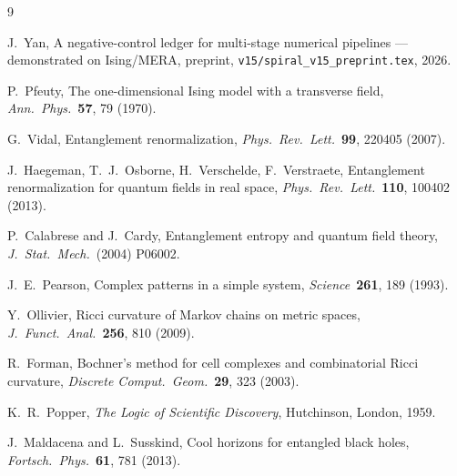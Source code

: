 \documentclass[11pt,a4paper]{article}
\newcommand{\code}[1]{\texttt{\small #1}}
\begin{document}
\begin{thebibliography}{9}

J.~Yan,
\newblock A negative-control ledger for multi-stage numerical pipelines
--- demonstrated on Ising/MERA,
\newblock preprint, \code{v15/spiral_v15_preprint.tex}, 2026.

P.~Pfeuty,
\newblock The one-dimensional Ising model with a transverse field,
\newblock \emph{Ann.\ Phys.}\ \textbf{57}, 79 (1970).

G.~Vidal,
\newblock Entanglement renormalization,
\newblock \emph{Phys.\ Rev.\ Lett.}\ \textbf{99}, 220405 (2007).

J.~Haegeman, T.~J.~Osborne, H.~Verschelde, F.~Verstraete,
\newblock Entanglement renormalization for quantum fields in real space,
\newblock \emph{Phys.\ Rev.\ Lett.}\ \textbf{110}, 100402 (2013).

P.~Calabrese and J.~Cardy,
\newblock Entanglement entropy and quantum field theory,
\newblock \emph{J.\ Stat.\ Mech.}\ (2004) P06002.

J.~E.~Pearson,
\newblock Complex patterns in a simple system,
\newblock \emph{Science}\ \textbf{261}, 189 (1993).

Y.~Ollivier,
\newblock Ricci curvature of Markov chains on metric spaces,
\newblock \emph{J.\ Funct.\ Anal.}\ \textbf{256}, 810 (2009).

R.~Forman,
\newblock Bochner's method for cell complexes and combinatorial Ricci curvature,
\newblock \emph{Discrete Comput.\ Geom.}\ \textbf{29}, 323 (2003).

K.~R.~Popper,
\newblock \emph{The Logic of Scientific Discovery},
\newblock Hutchinson, London, 1959.

J.~Maldacena and L.~Susskind,
\newblock Cool horizons for entangled black holes,
\newblock \emph{Fortsch.\ Phys.}\ \textbf{61}, 781 (2013).

\end{thebibliography}
\end{document}
